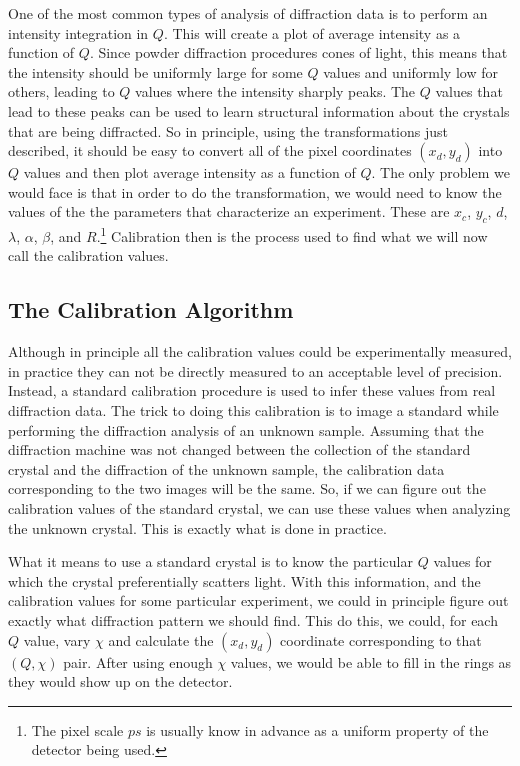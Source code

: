 One of the most common types of analysis of diffraction data
is to perform an intensity integration in $Q$. This will 
create a plot of average intensity as a function of $Q$.
Since powder diffraction procedures cones of light, this means
that the intensity should be uniformly large for some $Q$
values and uniformly low for others, leading to $Q$ values
where the intensity sharply peaks. The $Q$ values that lead 
to these peaks can be used to learn structural information
about the crystals that are being diffracted. So in principle,
using the transformations just described, it should be easy
to convert all of the pixel coordinates $(x_d,y_d)$ into
$Q$ values and then plot average intensity as a function of
$Q$. The only problem we would face is that in order to do
the transformation, we would need to know the values of the
the parameters that characterize an experiment. These are
$x_c$, $y_c$, $d$, $\lambda$, $\alpha$, $\beta$, and 
$R$.\footnote{The pixel scale $ps$ is usually know in advance 
as a uniform property of the detector being used.} Calibration
then is the process used to find what we will now call the
calibration values.

\subsection{The Calibration Algorithm}

Although in principle all the calibration values could be
experimentally measured, in practice they can not be
directly measured to an acceptable level of precision. 
Instead, a standard calibration procedure is used to 
infer these values from real diffraction data. The 
trick to doing this calibration is to image a standard
while performing the diffraction analysis of an 
unknown sample. Assuming that the diffraction machine
was not changed between the collection of the 
standard crystal and the diffraction of the unknown sample, 
the calibration data corresponding to the two 
images will be the same. So, if we can figure out the
calibration values of the standard crystal, we can
use these values when analyzing the unknown crystal.
This is exactly what is done in practice.

What it means to use a standard crystal is to know the
particular $Q$ values for which the crystal preferentially
scatters light. With this information, and the 
calibration values for some particular experiment,
we could in principle figure out exactly what diffraction
pattern we should find. This do this, we could, for
each $Q$ value, vary $\chi$ and calculate the 
$(x_d,y_d)$ coordinate corresponding to that $(Q,\chi)$
pair. After using enough $\chi$ values, we would be 
able to fill in the rings as they would show up on 
the detector.

